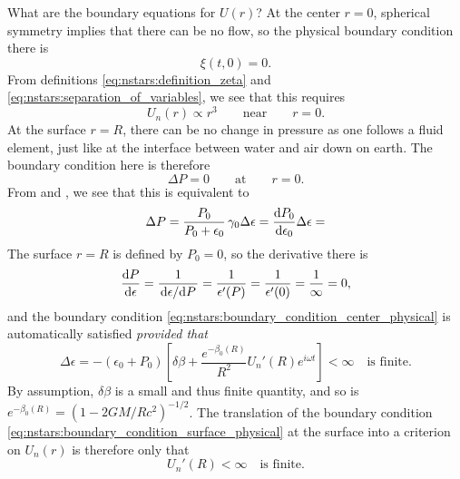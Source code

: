 What are the boundary equations for $U(r)$?
At the center $r = 0$, spherical symmetry implies that there can be no flow, so the physical boundary condition there is
\begin{equation}
	\xi(t, 0) = 0.
\label{eq:nstars:boundary_condition_center_physical}
\end{equation}
From definitions \eqref{eq:nstars:definition_zeta} and \eqref{eq:nstars:separation_of_variables}, we see that this requires
\begin{equation}
	U_n(r) \propto r^3
	\qquad \text{near} \qquad
	r = 0.
\label{eq:nstars:boundary_condition_center_mathematical}
\end{equation}
At the surface $r = R$, there can be no change in pressure as one follows a fluid element, just like at the interface between water and air down on earth.
The boundary condition here is therefore
\begin{equation}
	\Delta P = 0
	\qquad \text{at} \qquad
	r = 0.
\end{equation}
From  and , we see that this is equivalent to
\begin{equation}
	\Delta P = 
	\frac{P_0}{P_0 + \epsilon_0} \, \gamma_0 \Delta \epsilon =
	\odv{P_0}{\epsilon_0} \Delta \epsilon =
\end{equation}
The surface $r = R$ is defined by $P_0 = 0$, so the derivative there is
\begin{equation}
	\odv{P}{\epsilon} = \frac{1}{\odv{\epsilon}/{P}} = \frac{1}{\epsilon'(P)} = \frac{1}{\epsilon'(0)} = \frac{1}{\infty} = 0,
\label{eq:nstars:boundary_condition_surface_physical}
\end{equation}
and the boundary condition \eqref{eq:nstars:boundary_condition_center_physical} is automatically satisfied \emph{provided that}
\begin{equation}
	\Delta \epsilon = - \left( \epsilon_0 + P_0 \right) \left[ \delta\beta + \frac{e^{-\beta_0(R)}}{R^2} U_n'(R) e^{i \omega t} \right] < \infty \quad \text{is finite}.
\end{equation}
By assumption, $\delta\beta$ is a small and thus finite quantity, and so is $e^{-\beta_0(R)} = \left( 1 - 2 G M / R c^2 \right)^{-1/2}$.
The translation of the boundary condition \eqref{eq:nstars:boundary_condition_surface_physical} at the surface into a criterion on $U_n(r)$ is therefore only that
\begin{equation}
	U_n'(R) < \infty \quad \text{is finite} .
\label{eq:nstars:boundary_condition_surface_mathematical}
\end{equation}

